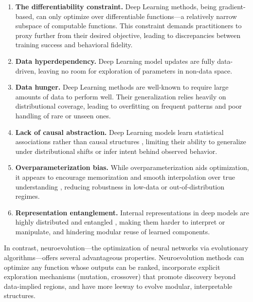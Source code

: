 \documentclass{article}
\begin{document}
\begin{enumerate}
    \item \textbf{The differentiability constraint.} Deep Learning methods, being gradient-based, can only optimize over differentiable functions---a relatively narrow subspace of computable functions. This constraint demands practitioners to proxy further from their desired objective, leading to discrepancies between training success and behavioral fidelity.

    \item \textbf{Data hyperdependency.} Deep Learning model updates are fully data-driven, leaving no room for exploration of parameters in non-data space.

    \item \textbf{Data hunger.} Deep Learning methods are well-known to require large amounts of data to perform well. Their generalization relies heavily on distributional coverage, leading to overfitting on frequent patterns and poor handling of rare or unseen ones.

    \item \textbf{Lack of causal abstraction.} Deep Learning models learn statistical associations rather than causal structures \cite{li2024causal}, limiting their ability to generalize under distributional shifts or infer intent behind observed behavior.

    \item \textbf{Overparameterization bias.} While overparameterization aids optimization, it appears to encourage memorization and smooth interpolation over true understanding \cite{djire2025memorization}, reducing robustness in low-data or out-of-distribution regimes.

    \item \textbf{Representation entanglement.} Internal representations in deep models are highly distributed and entangled \cite{kumar2025representation}, making them harder to interpret or manipulate, and hindering modular reuse of learned components.
\end{enumerate}

In contrast, neuroevolution---the optimization of neural networks via evolutionary algorithms---offers several advantageous properties. Neuroevolution methods can optimize any function whose outputs can be ranked, incorporate explicit exploration mechanisms (mutation, crossover) that promote discovery beyond data-implied regions, and have more leeway to evolve modular, interpretable structures.
\end{document}
